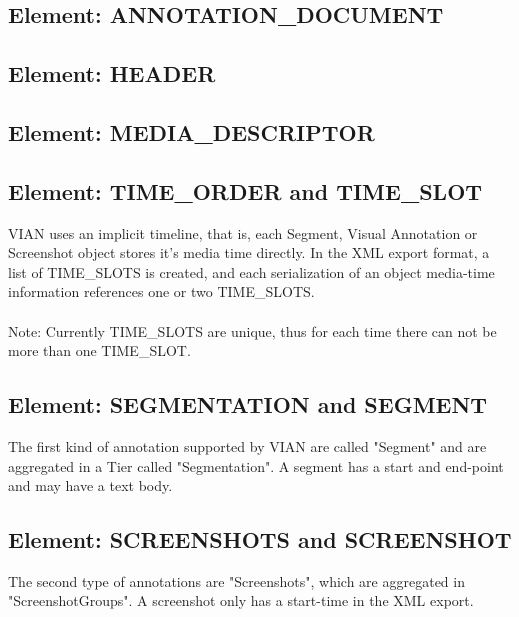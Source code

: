 \documentclass[11pt, a4paper,oneside,chapterprefix=false]{scrbook}
\begin{document}
\subsection{Element: ANNOTATION\_DOCUMENT}

\subsection{Element: HEADER}

\subsection{Element: MEDIA\_DESCRIPTOR}


\newpage
\subsection{Element: TIME\_ORDER and TIME\_SLOT}

VIAN uses an implicit timeline, that is, each Segment, Visual Annotation or Screenshot object stores it's media time directly. In the XML export format, a list of TIME\_SLOTS is created, and each serialization of an object media-time information references one or two TIME\_SLOTS. \\
\\
Note: Currently TIME\_SLOTS are unique, thus for each time there can not be more than one TIME\_SLOT.\\
\subsection{Element: SEGMENTATION and SEGMENT}

The first kind of annotation supported by VIAN are called "Segment" and are aggregated in a Tier called "Segmentation". A segment has a start and end-point and may have a text body. \\

\subsection{Element: SCREENSHOTS and SCREENSHOT}

The second type of annotations are "Screenshots", which are aggregated in "ScreenshotGroups". 
A screenshot only has a start-time in the XML export. 
\end{document}
